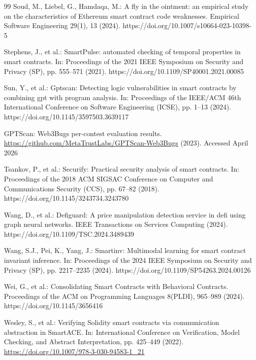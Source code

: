 \documentclass[pdflatex,sn-basic]{sn-jnl}%
\theoremstyle{thmstyleone}%
\theoremstyle{thmstyletwo}%
\theoremstyle{thmstylethree}%
\begin{document}
\begin{thebibliography}{99}
Soud, M., Liebel, G., Hamdaqa, M.: A fly in the ointment: an empirical study on the characteristics of Ethereum smart contract code weaknesses. Empirical Software Engineering 29(1), 13 (2024). https://doi.org/10.1007/s10664-023-10398-5

Stephens, J., et al.: SmartPulse: automated checking of temporal properties in smart contracts. In: Proceedings of the 2021 IEEE Symposium on Security and Privacy (SP), pp. 555--571 (2021). https://doi.org/10.1109/SP40001.2021.00085

Sun, Y., et al.: Gptscan: Detecting logic vulnerabilities in smart contracts by combining gpt with program analysis. In: Proceedings of the IEEE/ACM 46th International Conference on Software Engineering (ICSE), pp. 1--13 (2024). https://doi.org/10.1145/3597503.3639117

GPTScan: Web3Bugs per-contest evaluation results. \url{https://github.com/MetaTrustLabs/GPTScan-Web3Bugs} (2023). Accessed April 2026

Tsankov, P., et al.: Securify: Practical security analysis of smart contracts. In: Proceedings of the 2018 ACM SIGSAC Conference on Computer and Communications Security (CCS), pp. 67--82 (2018). https://doi.org/10.1145/3243734.3243780

Wang, D., et al.: Defiguard: A price manipulation detection service in defi using graph neural networks. IEEE Transactions on Services Computing (2024). https://doi.org/10.1109/TSC.2024.3489439

Wang, S.J., Pei, K., Yang, J.: Smartinv: Multimodal learning for smart contract invariant inference. In: Proceedings of the 2024 IEEE Symposium on Security and Privacy (SP), pp. 2217--2235 (2024). https://doi.org/10.1109/SP54263.2024.00126

Wei, G., et al.: Consolidating Smart Contracts with Behavioral Contracts. Proceedings of the ACM on Programming Languages 8(PLDI), 965--989 (2024). https://doi.org/10.1145/3656416

Wesley, S., et al.: Verifying Solidity smart contracts via communication abstraction in SmartACE. In: International Conference on Verification, Model Checking, and Abstract Interpretation, pp. 425--449 (2022). \url{https://doi.org/10.1007/978-3-030-94583-1_21}


\end{thebibliography}
\end{document}
